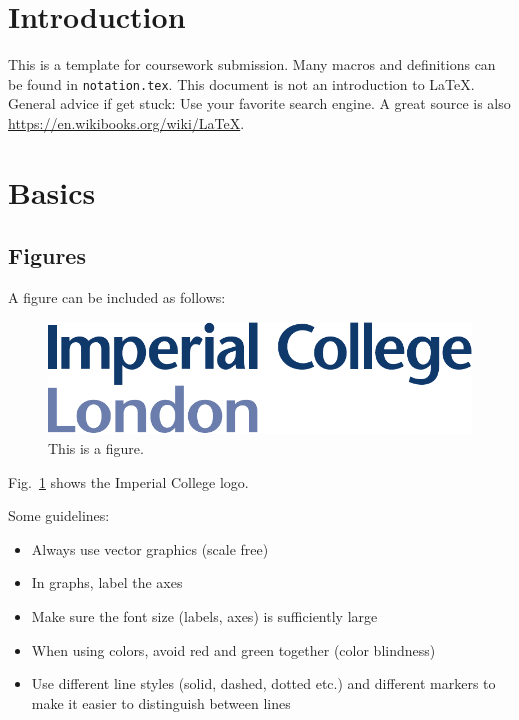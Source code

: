 \documentclass[12pt,twoside]{article}
\begin{document}



\section{Introduction}
This is a template for coursework submission. Many macros and definitions can be found in \texttt{notation.tex}. This document is not an introduction to LaTeX. General advice if get stuck: Use your favorite search engine. A great source is also \mbox{\url{https://en.wikibooks.org/wiki/LaTeX}}.

\section{Basics}

\subsection{Figures}
A figure can be included as follows:
\begin{figure}[tb]
\centering %
\includegraphics[width = 0.7\hsize]{./figures/imperial} %
\caption{This is a figure.} %
\label{fig:imperial figure} %
\end{figure}
Fig.~\ref{fig:imperial figure} shows the Imperial College logo. 

Some guidelines:
\begin{itemize}
\item Always use vector graphics (scale free)
\item In graphs, label the axes
\item Make sure the font size (labels, axes) is sufficiently large
\item When using colors, avoid red and green together (color blindness)
\item Use different line styles (solid, dashed, dotted etc.) and different markers to make it easier to distinguish between lines
\end{itemize}
\end{document}
